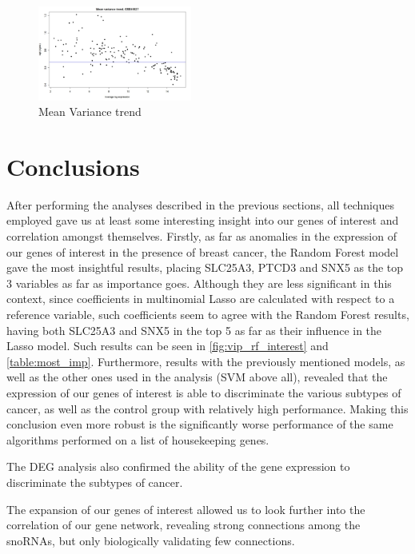 \documentclass[journal]{IEEEtran}
\begin{document}
\begin{figure}[!ht]
    \centering
    \includegraphics[width=0.45\textwidth]{images/DE/MeanVarianceDE.jpg}
    \caption{Mean Variance trend}
    \label{fig:MeanVarianceDE}
\end{figure}

\section{Conclusions}
After performing the analyses described in the previous sections, all techniques employed gave us at least some interesting insight into our genes of interest and correlation amongst themselves. Firstly, as far as anomalies in the expression of our genes of interest in the presence of breast cancer, the Random Forest model gave the most insightful results, placing SLC25A3, PTCD3 and SNX5 as the top 3 variables as far as importance goes. Although they are less significant in this context, since coefficients in multinomial Lasso are calculated with respect to a reference variable, such coefficients seem to agree with the Random Forest results, having both SLC25A3 and SNX5 in the top 5 as far as their influence in the Lasso model. Such results can be seen in \cref{fig:vip_rf_interest} and \cref{table:most_imp}. \newline
Furthermore, results with the previously mentioned models, as well as the other ones used in the analysis (SVM above all), revealed that the expression of our genes of interest is able to discriminate the various subtypes of cancer, as well as the control group with relatively high performance. Making this conclusion even more robust is the significantly worse performance of the same algorithms performed on a list of housekeeping genes.

The DEG analysis also confirmed the ability of the gene expression to discriminate the subtypes of cancer.

The expansion of our genes of interest allowed us to look further into the correlation of our gene network, revealing strong connections among the snoRNAs, but only biologically validating few connections.
\end{document}
